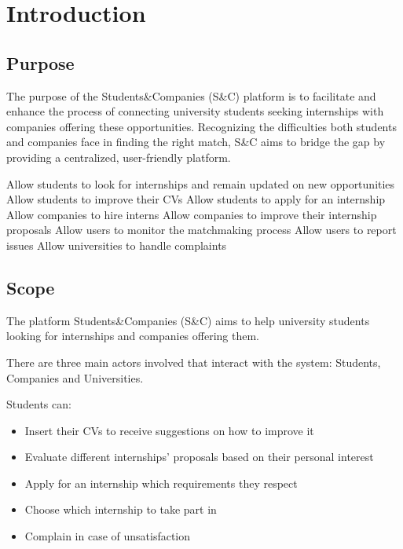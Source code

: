 \chapter{Introduction}

\section{Purpose}
The purpose of the Students\&Companies (S\&C) platform is to facilitate and enhance the process of connecting university students seeking internships with companies offering these opportunities. Recognizing the difficulties both students and companies face in finding the right match, S\&C aims to bridge the gap by providing a centralized, user-friendly platform. 
  
\begin{goalist}
\item Allow students to look for internships and remain updated on new opportunities
\itemgb Allow students to improve their CVs
\itemgc Allow students to apply for an internship
\itemgd Allow companies to hire interns
\itemge Allow companies to improve their internship proposals
\itemgf Allow users to monitor the matchmaking process
\itemgg Allow users to report issues
\itemgh Allow universities to handle complaints
\end{goalist}

\section{Scope}

The platform Students\&Companies (S\&C) aims to help university students looking for internships and companies offering them.

There are three main actors involved that interact with the system: Students, Companies and Universities. 

Students can:
\begin{itemize}
    \item Insert their CVs to receive suggestions on how to improve it
    \item Evaluate different internships’ proposals based on their personal interest
    \item Apply for an internship which requirements they respect
    \item Choose which internship to take part in 
    \item Complain in case of unsatisfaction
\end{itemize}

